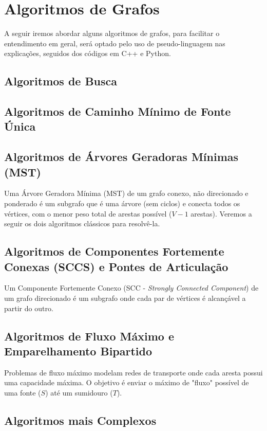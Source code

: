 \section{Algoritmos de Grafos}
A seguir iremos abordar alguns algoritmos de grafos, para facilitar o
entendimento em geral, será optado pelo uso de pseudo-linguagem nas
explicações, seguidos dos códigos em C++ e Python.

\subsection{Algoritmos de Busca}

\newpage


\subsection{Algoritmos de Caminho Mínimo de Fonte Única}




\subsection{Algoritmos de Árvores Geradoras Mínimas (MST)}
Uma Árvore Geradora Mínima (MST) de um grafo conexo, não direcionado e
ponderado é um subgrafo que é uma árvore (sem ciclos) e conecta todos os
vértices, com o menor peso total de arestas possível ($V - 1$ arestas). Veremos
a seguir os dois algoritmos clássicos para resolvê-la. 
 

\subsection{Algoritmos de Componentes Fortemente Conexas (SCCS) e Pontes de Articulação}
Um Componente Fortemente Conexo (SCC - \textit{Strongly Connected Component})
de um grafo direcionado é um subgrafo onde cada par de vértices é alcançável a
partir do outro.  

\subsection{Algoritmos de Fluxo Máximo e Emparelhamento Bipartido}
Problemas de fluxo máximo modelam redes de transporte onde cada aresta possui
uma capacidade máxima. O objetivo é enviar o máximo de "fluxo" possível de uma
fonte ($S$) até um sumidouro ($T$). 


\subsection{Algoritmos mais Complexos}



